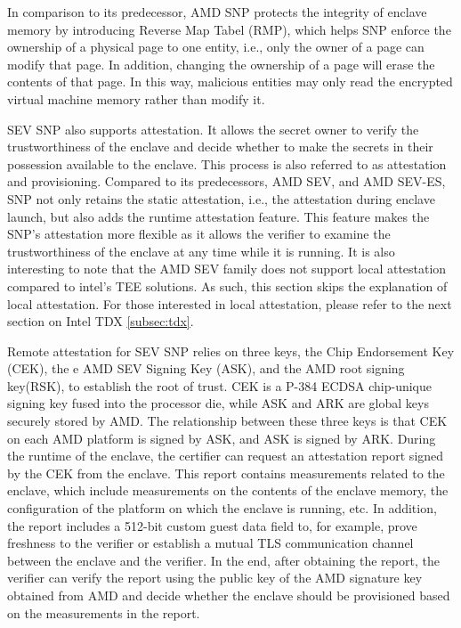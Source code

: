 In comparison to its predecessor, AMD SNP protects the integrity of enclave memory by introducing Reverse Map Tabel (RMP), which helps SNP enforce the ownership of a physical page to one entity, i.e., 
only the owner of a page can modify that page. In addition, changing the ownership of a page will erase the contents of that page. In this way, malicious entities may only read the 
encrypted virtual machine memory rather than modify it.

SEV SNP also supports attestation. It allows the secret owner to verify the trustworthiness of the enclave and decide whether to make the secrets in their possession available to the enclave. 
This process is also referred to as attestation and provisioning. Compared to its predecessors, AMD SEV, and AMD SEV-ES, SNP not only retains the static attestation, i.e., the attestation during 
enclave launch, but also adds the runtime attestation feature. This feature makes the SNP's attestation more flexible as it allows the verifier to examine the trustworthiness of the enclave at 
any time while it is running. It is also interesting to note that the AMD SEV family does not support local attestation compared to intel's TEE solutions. As such, this section skips the 
explanation of local attestation. For those interested in local attestation, please refer to the next section on Intel TDX \ref*{subsec:tdx}.

Remote attestation for SEV SNP relies on three keys, the  Chip Endorsement Key (CEK), the e AMD SEV Signing Key (ASK), and the AMD root signing key(RSK), to establish 
the root of trust\cite*{Menetrey2022AnES}. CEK is a P-384 ECDSA chip-unique signing key fused into the processor die, while ASK and ARK are global keys securely stored by AMD. The relationship between these three 
keys is that CEK on each AMD platform is signed by ASK, and ASK is signed by ARK. During the runtime of the enclave, the certifier can request an attestation report signed by the CEK from the enclave. 
This report contains measurements related to the enclave, which include measurements on the contents of the enclave memory, the configuration of the platform on which the enclave is running, etc.
 In addition, the report includes a 512-bit custom guest data field to, for example, prove freshness to the verifier or establish a mutual TLS communication channel between the enclave and the 
 verifier. In the end, after obtaining the report, the verifier can verify the report using the public key of the AMD signature key obtained from AMD and decide whether the enclave should be 
 provisioned based on the measurements in the report.

